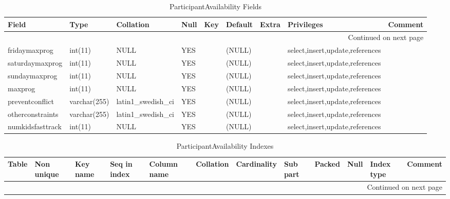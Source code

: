\documentclass[tablesignature,landscape]{scrartcl}
\begin{document}
\begin{longtable}{|l|l|l|l|l|l|l|l|l|}
\caption{ParticipantAvailability Fields} \label{tbl:participantavailabilityfields}\\
\hline
 Field             &  Type          &  Collation                &  Null  &  Key  &  Default  &  Extra  &  Privileges                       &  Comment \\
\hline
\endhead
\hline\multicolumn{9}{r}{Continued on next page}\
\endfoot
\endlastfoot
\hline
 badgeid           &  varchar(15)   &  latin1\_{}swedish\_{}ci  &        &  PRI  &           &         &  select,insert,update,references  &           \\
 fridaymaxprog     &  int(11)       &  NULL                     &  YES   &       &  (NULL)   &         &  select,insert,update,references  &           \\
 saturdaymaxprog   &  int(11)       &  NULL                     &  YES   &       &  (NULL)   &         &  select,insert,update,references  &           \\
 sundaymaxprog     &  int(11)       &  NULL                     &  YES   &       &  (NULL)   &         &  select,insert,update,references  &           \\
 maxprog           &  int(11)       &  NULL                     &  YES   &       &  (NULL)   &         &  select,insert,update,references  &           \\
 preventconflict   &  varchar(255)  &  latin1\_{}swedish\_{}ci  &  YES   &       &  (NULL)   &         &  select,insert,update,references  &           \\
 otherconstraints  &  varchar(255)  &  latin1\_{}swedish\_{}ci  &  YES   &       &  (NULL)   &         &  select,insert,update,references  &           \\
 numkidsfasttrack  &  int(11)       &  NULL                     &  YES   &       &  (NULL)   &         &  select,insert,update,references  &           \\
\hline
\end{longtable}


\begin{longtable}{|l|l|l|l|l|l|l|l|l|l|l|l|}
\caption{ParticipantAvailability Indexes} \label{tbl:participantavailabilityindexes}\\
\hline
 Table                    &  Non unique  &  Key name  &  Seq in index  &  Column name  &  Collation  &  Cardinality  &  Sub part  &  Packed  &  Null  &  Index type  &  Comment \\
\hline
\endhead
\hline\multicolumn{12}{r}{Continued on next page}\
\endfoot
\endlastfoot
\hline
 ParticipantAvailability  &           0  &  PRIMARY   &             1  &  badgeid      &  A          &            2  &  (NULL)    &  (NULL)  &        &  BTREE       &           \\
\hline
\end{longtable}
\end{document}
